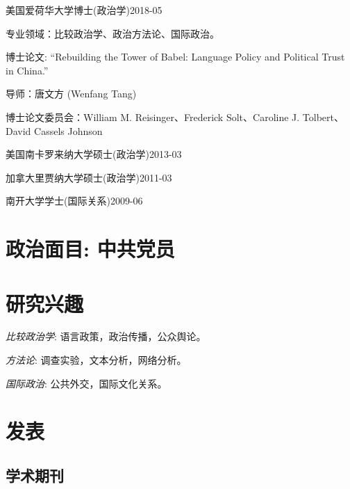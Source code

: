 \documentclass[10.5pt,]{article}
\providecommand{\tightlist}{%
	\setlength{\itemsep}{0pt}\setlength{\parskip}{0pt}}
\renewenvironment{itemize}{
	\begin{list}{}{
			\setlength{\leftmargin}{1.5em}
		}
	}{
	\end{list}
}
\begin{document}
\begin{itemize}
\tightlist
\item
  美国爱荷华大学博士(政治学)\hfill 2018-05

  \begin{itemize}
  \tightlist
  \item
    \footnotesize 专业领域：比较政治学、政治方法论、国际政治。
  \item
    \footnotesize 博士论文: ``Rebuilding the Tower of Babel: Language
    Policy and Political Trust in China.''

    \begin{itemize}
    \tightlist
    \item
      导师：唐文方 (Wenfang Tang)
    \item
      博士论文委员会：William M. Reisinger、Frederick Solt、Caroline J.
      Tolbert、David Cassels Johnson
    \end{itemize}
  \end{itemize}
\item
  美国南卡罗来纳大学硕士(政治学)\hfill 2013-03
\item
  加拿大里贾纳大学硕士(政治学)\hfill 2011-03
\item
  南开大学学士(国际关系)\hfill 2009-06
\end{itemize}

\hypertarget{-}{%
\section{政治面目: 中共党员}\label{-}}

\section{研究兴趣}

\begin{itemize}
\tightlist
\item
  \emph{比较政治学}: 语言政策，政治传播，公众舆论。
\item
  \emph{方法论}: 调查实验，文本分析，网络分析。
\item
  \emph{国际政治}: 公共外交，国际文化关系。
\end{itemize}

\section{发表}

\subsection{学术期刊}
\end{document}
